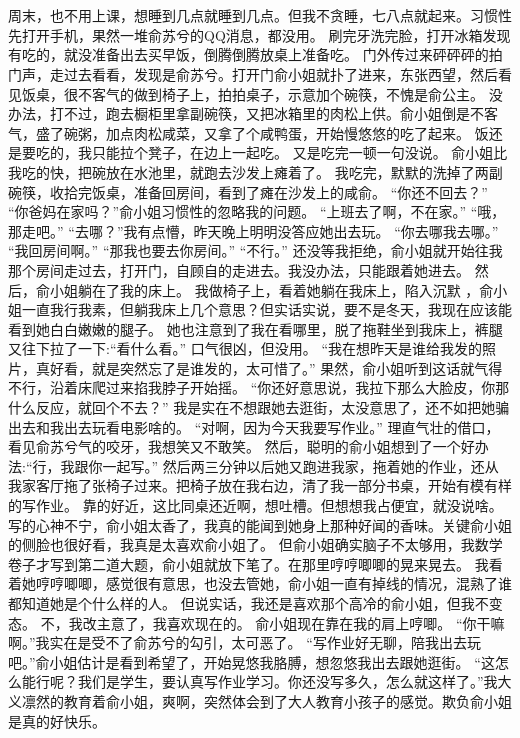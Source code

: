 \chapter{}
周末，也不用上课，想睡到几点就睡到几点。但我不贪睡，七八点就起来。习惯性先打开手机，果然一堆俞苏兮的QQ消息，都没用。
刷完牙洗完脸，打开冰箱发现有吃的，就没准备出去买早饭，倒腾倒腾放桌上准备吃。
门外传过来砰砰砰的拍门声，走过去看看，发现是俞苏兮。打开门俞小姐就扑了进来，东张西望，然后看见饭桌，很不客气的做到椅子上，拍拍桌子，示意加个碗筷，不愧是俞公主。
没办法，打不过，跑去橱柜里拿副碗筷，又把冰箱里的肉松上供。俞小姐倒是不客气，盛了碗粥，加点肉松咸菜，又拿了个咸鸭蛋，开始慢悠悠的吃了起来。
饭还是要吃的，我只能拉个凳子，在边上一起吃。
又是吃完一顿一句没说。
俞小姐比我吃的快，把碗放在水池里，就跑去沙发上瘫着了。
我吃完，默默的洗掉了两副碗筷，收拾完饭桌，准备回房间，看到了瘫在沙发上的咸俞。
“你还不回去？”
“你爸妈在家吗？”俞小姐习惯性的忽略我的问题。
“上班去了啊，不在家。”
“哦，那走吧。”
“去哪？”我有点懵，昨天晚上明明没答应她出去玩。
“你去哪我去哪。”
“我回房间啊。”
“那我也要去你房间。”
“不行。” 还没等我拒绝，俞小姐就开始往我那个房间走过去，打开门，自顾自的走进去。我没办法，只能跟着她进去。
然后，俞小姐躺在了我的床上。 我做椅子上，看着她躺在我床上，陷入沉默 ，俞小姐一直我行我素，但躺我床上几个意思？但实话实说，要不是冬天，我现在应该能看到她白白嫩嫩的腿子。
她也注意到了我在看哪里，脱了拖鞋坐到我床上，裤腿又往下拉了一下:“看什么看。”
口气很凶，但没用。
“我在想昨天是谁给我发的照片，真好看，就是突然忘了是谁发的，太可惜了。”
果然，俞小姐听到这话就气得不行，沿着床爬过来掐我脖子开始摇。
“你还好意思说，我拉下那么大脸皮，你那什么反应，就回个不去？”
我是实在不想跟她去逛街，太没意思了，还不如把她骗出去和我出去玩看电影啥的。
“对啊，因为今天我要写作业。”
理直气壮的借口，看见俞苏兮气的咬牙，我想笑又不敢笑。
然后，聪明的俞小姐想到了一个好办法:“行，我跟你一起写。”
然后两三分钟以后她又跑进我家，拖着她的作业，还从我家客厅拖了张椅子过来。把椅子放在我右边，清了我一部分书桌，开始有模有样的写作业。
靠的好近，这比同桌还近啊，想吐槽。但想想我占便宜，就没说啥。
写的心神不宁，俞小姐太香了，我真的能闻到她身上那种好闻的香味。关键俞小姐的侧脸也很好看，我真是太喜欢俞小姐了。
但俞小姐确实脑子不太够用，我数学卷子才写到第二道大题，俞小姐就放下笔了。在那里哼哼唧唧的晃来晃去。 我看着她哼哼唧唧，感觉很有意思，也没去管她，俞小姐一直有掉线的情况，混熟了谁都知道她是个什么样的人。 但说实话，我还是喜欢那个高冷的俞小姐，但我不变态。
不，我改主意了，我喜欢现在的。
俞小姐现在靠在我的肩上哼唧。
“你干嘛啊。”我实在是受不了俞苏兮的勾引，太可恶了。
“写作业好无聊，陪我出去玩吧。”俞小姐估计是看到希望了，开始晃悠我胳膊，想忽悠我出去跟她逛街。
“这怎么能行呢？我们是学生，要认真写作业学习。你还没写多久，怎么就这样了。”我大义凛然的教育着俞小姐，爽啊，突然体会到了大人教育小孩子的感觉。欺负俞小姐是真的好快乐。

